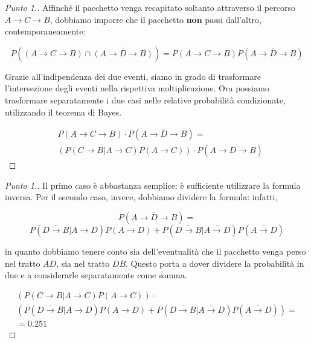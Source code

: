 \documentclass{beamer}
\begin{document}
\begin{frame}
	\begin{proof}[Punto 1.]\renewcommand{\qedsymbol}{$\longrightarrow$}
		Affinché il pacchetto venga recapitato soltanto attraverso il percorso $A \rightarrow C \rightarrow B$, dobbiamo imporre che il pacchetto \textbf{non} passi dall'altro, contemporaneamente:

		\[
			P((A \rightarrow C \rightarrow B) \cap \overline{(A \rightarrow D \rightarrow B)}) = P(A \rightarrow C \rightarrow B)P(\overline{A \rightarrow D \rightarrow B})
		\]

		Grazie all'indipendenza dei due eventi, siamo in grado di trasformare l'intersezione degli eventi nella rispettiva moltiplicazione. Ora possiamo trasformare separatamente i due casi nelle relative probabilità condizionate, utilizzando il teorema di Bayes.

		\begin{equation*}
			\begin{split}
				&P(A \rightarrow C \rightarrow B) \cdot P(\overline{A \rightarrow D \rightarrow B}) = \\
				&(P(C \rightarrow B|A \rightarrow C)P(A \rightarrow C)) \cdot P(\overline{A \rightarrow D \rightarrow B})
			\end{split}
		\end{equation*}
		\qedhere
	\end{proof}
\end{frame}
\begin{frame}
	\begin{proof}[Punto 1.]

		Il primo caso è abbastanza semplice: è sufficiente utilizzare la formula inversa. Per il secondo caso, invece, dobbiamo dividere la formula: infatti,

		\[
			P(\overline{A \rightarrow D \rightarrow B}) =
		\]
		\[
			P(\overline{D \rightarrow B}|A \rightarrow D)P(A \rightarrow D) + P(\overline{D \rightarrow B}|\overline{A \rightarrow D})P(\overline{A \rightarrow D})
		\]

		in quanto dobbiamo tenere conto sia dell'eventualità che il pacchetto venga perso nel tratto $AD$, sia nel tratto $DB$. Questo porta a dover dividere la probabilità in due e a considerarle separatamente come somma.

		\begin{gather*}
			\left( P(C \rightarrow B|A \rightarrow C)P(A \rightarrow C) \right) \cdot \\
			\left( P(\overline{D \rightarrow B}|A \rightarrow D)P(A \rightarrow D) + P(\overline{D \rightarrow B}|\overline{A \rightarrow D})P(\overline{A \rightarrow D}) \right) = \\
			= 0.251
		\end{gather*} \qedhere
	\end{proof}
\end{frame}
\end{document}
